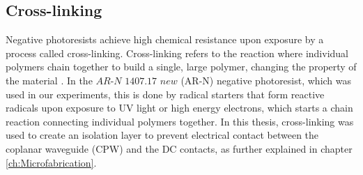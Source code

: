 \subsection{Cross-linking}
Negative photoresists achieve high chemical resistance upon exposure by a process called cross-linking. Cross-linking refers to the reaction where individual polymers chain together to build a single, large polymer, changing the property of the material \cite{AllresistPhotoresistOnline}. In the $\textit{AR-N 1407.17 new}$ (AR-N) negative photoresist, which was used in our experiments, this is done by radical starters that form reactive radicals upon exposure to UV light or high energy electrons, which starts a chain reaction connecting individual polymers together. In this thesis, cross-linking was used to create an isolation layer to prevent electrical contact between the coplanar waveguide (CPW) and the DC contacts, as further explained in chapter \ref{ch:Microfabrication}.
